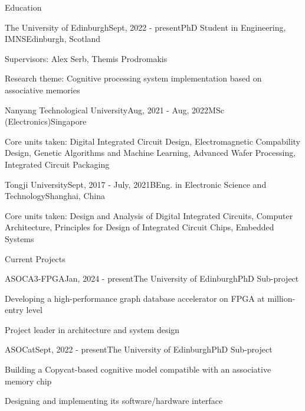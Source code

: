\documentclass{resume} %
\begin{document}

\begin{rSection}{Education}

	\begin{rSubsection}{The University of Edinburgh}{Sept, 2022 - present}{PhD Student in Engineering, IMNS}{Edinburgh, Scotland}
		\item Supervisors: Alex Serb, Themis Prodromakis
		\item Research theme: Cognitive processing system implementation based on associative memories
	\end{rSubsection}
	
	\begin{rSubsection}{Nanyang Technological University}{Aug, 2021 - Aug, 2022}{MSc (Electronics)}{Singapore}
		\item Core units taken: Digital Integrated Circuit Design, Electromagnetic Compability Design, Genetic Algorithms and Machine Learning, Advanced Wafer Processing, Integrated Circuit Packaging
	\end{rSubsection}

	\begin{rSubsection}{Tongji University}{Sept, 2017 - July, 2021}{BEng. in Electronic Science and Technology}{Shanghai, China}
		\item Core units taken: Design and Analysis of Digital Integrated Circuits, Computer Architecture, Principles for Design of Integrated Circuit Chips, Embedded Systems
	\end{rSubsection}

\end{rSection}

\begin{rSection}{Current Projects}
	
	\begin{rSubsection}{ASOCA3-FPGA}{Jan, 2024 - present}{The University of Edinburgh}{PhD Sub-project}
		\item Developing a high-performance graph database accelerator on FPGA at million-entry level
		\item Project leader in architecture and system design
	\end{rSubsection}
	
	\begin{rSubsection}{ASOCat}{Sept, 2022 - present}{The University of Edinburgh}{PhD Sub-project}
		\item Building a Copycat-based cognitive model compatible with an associative memory chip
		\item Designing and implementing its software/hardware interface
	\end{rSubsection}

\end{rSection}
\end{document}

